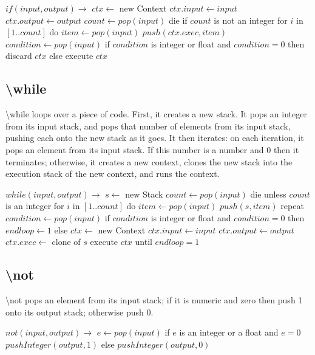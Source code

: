 \documentclass{article}
\let\bs\textbackslash
\def\pc{\bigskip\obeylines\parindent=0pt}
\begin{document}
{{{{{{\pc
$if(input,output) \rightarrow$
\quad $ctx \leftarrow$ new Context
\quad $ctx.input \leftarrow input$
\quad $ctx.output \leftarrow output$
\quad $count \leftarrow pop(input)$
\quad die if $count$ is not an integer
\quad for $i$ in $[1..count]$ do
\quad \quad $item \leftarrow pop(input)$
\quad \quad $push(ctx.exec, item)$
\quad $condition \leftarrow pop(input)$
\quad if $condition$ is integer or float and $condition = 0$ then
\quad \quad discard $ctx$
\quad else
\quad \quad execute $ctx$
}

\subsection{\bs while}

\bs while loops over a piece of code.  First, it creates a new stack.  It pops an integer from its input stack, and pops that number of elements from its input stack, pushing each onto the new stack as it goes.  It then iterates: on each iteration, it pops an element from its input stack.  If this number is a number and 0 then it terminates; otherwise, it creates a new context, clones the new stack into the execution stack of the new context, and runs the context.

{\pc
$while(input, output) \rightarrow$
\quad $s \leftarrow$ new Stack
\quad $count \leftarrow pop(input)$
\quad die unless $count$ is an integer
\smallskip\quad for $i$ in $[1..count]$ do
\quad \quad $item \leftarrow pop(input)$
\quad \quad $push(s,item)$
\smallskip\quad repeat
\quad \quad $condition \leftarrow pop(input)$
\quad \quad if $condition$ is integer or float and $condition=0$ then
\quad \quad\quad $endloop \leftarrow 1$
\quad \quad else
\quad \quad \quad $ctx \leftarrow$ new Context
\quad \quad \quad $ctx.input\leftarrow input$
\quad \quad \quad $ctx.output\leftarrow output$
\quad \quad \quad $ctx.exec \leftarrow$ clone of $s$
\quad \quad \quad execute $ctx$
\quad until $endloop=1$
}

\subsection{\bs not}
\bs not pops an element from its input stack; if it is numeric and zero then push 1 onto its output stack; otherwise push 0.

{\pc
$not(input,output) \rightarrow$
\quad $e \leftarrow pop(input)$
\quad if $e$ is an integer or a float and $e=0$
\quad \quad $pushInteger(output, 1)$
\quad else
\quad \quad $pushInteger(output, 0)$
}

}}}}}
\end{document}
